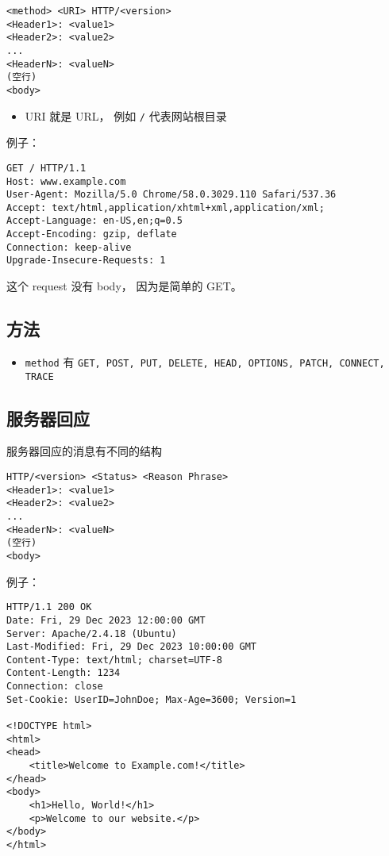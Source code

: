 \begin{lstlisting}[language=none]
<method> <URI> HTTP/<version>
<Header1>: <value1>
<Header2>: <value2>
...
<HeaderN>: <valueN>
(空行)
<body>
\end{lstlisting}

\begin{itemize}
\item URI 就是 URL， 例如 \verb`/` 代表网站根目录
\end{itemize}

例子：
\begin{lstlisting}[language=none]
GET / HTTP/1.1
Host: www.example.com
User-Agent: Mozilla/5.0 Chrome/58.0.3029.110 Safari/537.36
Accept: text/html,application/xhtml+xml,application/xml;
Accept-Language: en-US,en;q=0.5
Accept-Encoding: gzip, deflate
Connection: keep-alive
Upgrade-Insecure-Requests: 1
\end{lstlisting}
这个 request 没有 body， 因为是简单的 GET。

\subsection{方法}
\begin{itemize}
\item \verb|method| 有 \verb|GET, POST, PUT, DELETE, HEAD, OPTIONS, PATCH, CONNECT, TRACE|
\end{itemize}


\subsection{服务器回应}
服务器回应的消息有不同的结构
\begin{lstlisting}[language=none]
HTTP/<version> <Status> <Reason Phrase>
<Header1>: <value1>
<Header2>: <value2>
...
<HeaderN>: <valueN>
(空行)
<body>
\end{lstlisting}

例子：
\begin{lstlisting}[language=none]
HTTP/1.1 200 OK
Date: Fri, 29 Dec 2023 12:00:00 GMT
Server: Apache/2.4.18 (Ubuntu)
Last-Modified: Fri, 29 Dec 2023 10:00:00 GMT
Content-Type: text/html; charset=UTF-8
Content-Length: 1234
Connection: close
Set-Cookie: UserID=JohnDoe; Max-Age=3600; Version=1

<!DOCTYPE html>
<html>
<head>
    <title>Welcome to Example.com!</title>
</head>
<body>
    <h1>Hello, World!</h1>
    <p>Welcome to our website.</p>
</body>
</html>
\end{lstlisting}

